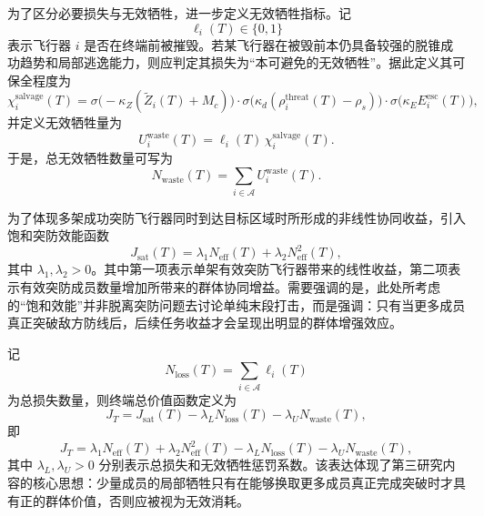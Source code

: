 为了区分必要损失与无效牺牲，进一步定义无效牺牲指标。记
\begin{equation}
\ell_i(T)\in\{0,1\}
\end{equation}
表示飞行器 $i$ 是否在终端前被摧毁。若某飞行器在被毁前本仍具备较强的脱锥成功趋势和局部逃逸能力，则应判定其损失为“本可避免的无效牺牲”。据此定义其可保全程度为
\begin{equation}
\chi_i^{\mathrm{salvage}}(T)
=
\sigma\!\bigl(-\kappa_Z(\widetilde Z_i(T)+M_c)\bigr)
\cdot
\sigma\!\bigl(\kappa_d(\rho_i^{\mathrm{threat}}(T)-\rho_s)\bigr)
\cdot
\sigma\!\bigl(\kappa_E E_i^{\mathrm{esc}}(T)\bigr),
\end{equation}
并定义无效牺牲量为
\begin{equation}
U_i^{\mathrm{waste}}(T)
=
\ell_i(T)\,\chi_i^{\mathrm{salvage}}(T).
\end{equation}
于是，总无效牺牲数量可写为
\begin{equation}
N_{\mathrm{waste}}(T)
=
\sum_{i\in\mathcal{A}} U_i^{\mathrm{waste}}(T).
\end{equation}

为了体现多架成功突防飞行器同时到达目标区域时所形成的非线性协同收益，引入饱和突防效能函数
\begin{equation}
J_{\mathrm{sat}}(T)
=
\lambda_1 N_{\mathrm{eff}}(T)
+
\lambda_2 N_{\mathrm{eff}}^2(T),
\end{equation}
其中 $\lambda_1,\lambda_2>0$。其中第一项表示单架有效突防飞行器带来的线性收益，第二项表示有效突防成员数量增加所带来的群体协同增益。需要强调的是，此处所考虑的“饱和效能”并非脱离突防问题去讨论单纯末段打击，而是强调：只有当更多成员真正突破敌方防线后，后续任务收益才会呈现出明显的群体增强效应。

记
\begin{equation}
N_{\mathrm{loss}}(T)=\sum_{i\in\mathcal{A}}\ell_i(T)
\end{equation}
为总损失数量，则终端总价值函数定义为
\begin{equation}
J_T
=
J_{\mathrm{sat}}(T)
-
\lambda_L N_{\mathrm{loss}}(T)
-
\lambda_U N_{\mathrm{waste}}(T),
\end{equation}
即
\begin{equation}
J_T
=
\lambda_1 N_{\mathrm{eff}}(T)
+
\lambda_2 N_{\mathrm{eff}}^2(T)
-
\lambda_L N_{\mathrm{loss}}(T)
-
\lambda_U N_{\mathrm{waste}}(T),
\end{equation}
其中 $\lambda_L,\lambda_U>0$ 分别表示总损失和无效牺牲惩罚系数。该表达体现了第三研究内容的核心思想：少量成员的局部牺牲只有在能够换取更多成员真正完成突破时才具有正的群体价值，否则应被视为无效消耗。

